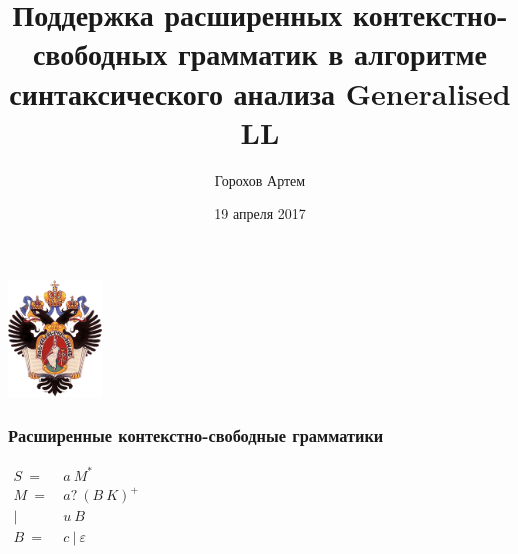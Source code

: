 \documentclass{beamer}
\title[]{Поддержка расширенных контекстно-свободных грамматик в алгоритме синтаксического анализа Generalised LL}
\institute[СПбГУ]{ Санкт-Петербургский Государственный Университет }
\author[Горохов Артем]{Горохов Артем}
\date{19 апреля 2017}
\begin{document}
 
	
	\begin{frame}
		\begin{center} 
			{\includegraphics[width=2.5cm]{pictures/SPbGU_Logo.png}} 
		\end{center}
		\titlepage
	\end{frame}
    
    


	\begin{frame} 
		\frametitle{Расширенные контекстно-свободные грамматики}
		\begin{center}
			{$\begin{aligned}
				S\ =&\ a\ M^* \\
				M\ =&\ a?\ (B\ K)^+ \\
				|&\ u\ B \\
				B\ =&\ c\ |\ \varepsilon
				\end{aligned}$}
		\end{center}
	\end{frame}
	
\end{document}

